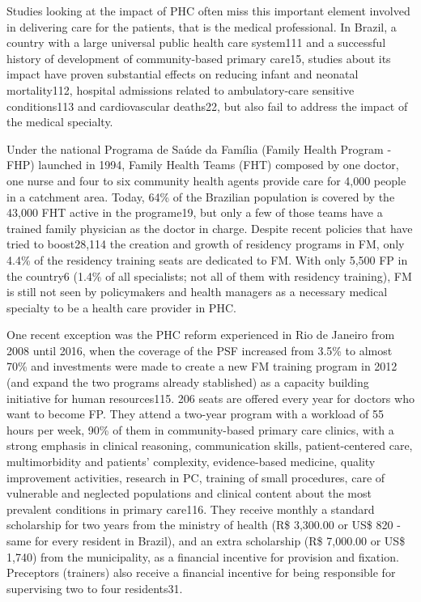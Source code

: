 \documentclass[]{book}
\begin{document}
Studies looking at the impact of PHC often miss this important element involved in delivering care for the patients, that is the medical professional. In Brazil, a country with a large universal public health care system111 and a successful history of development of community-based primary care15, studies about its impact have proven substantial effects on reducing infant and neonatal mortality112, hospital admissions related to ambulatory-care sensitive conditions113 and cardiovascular deaths22, but also fail to address the impact of the medical specialty.

Under the national Programa de Saúde da Família (Family Health Program - FHP) launched in 1994, Family Health Teams (FHT) composed by one doctor, one nurse and four to six community health agents provide care for 4,000 people in a catchment area. Today, 64\% of the Brazilian population is covered by the 43,000 FHT active in the programe19, but only a few of those teams have a trained family physician as the doctor in charge. Despite recent policies that have tried to boost28,114 the creation and growth of residency programs in FM, only 4.4\% of the residency training seats are dedicated to FM. With only 5,500 FP in the country6 (1.4\% of all specialists; not all of them with residency training), FM is still not seen by policymakers and health managers as a necessary medical specialty to be a health care provider in PHC.

One recent exception was the PHC reform experienced in Rio de Janeiro from 2008 until 2016, when the coverage of the PSF increased from 3.5\% to almost 70\% and investments were made to create a new FM training program in 2012 (and expand the two programs already stablished) as a capacity building initiative for human resources115. 206 seats are offered every year for doctors who want to become FP. They attend a two-year program with a workload of 55 hours per week, 90\% of them in community-based primary care clinics, with a strong emphasis in clinical reasoning, communication skills, patient-centered care, multimorbidity and patients' complexity, evidence-based medicine, quality improvement activities, research in PC, training of small procedures, care of vulnerable and neglected populations and clinical content about the most prevalent conditions in primary care116. They receive monthly a standard scholarship for two years from the ministry of health (R\$ 3,300.00 or US\$ 820 - same for every resident in Brazil), and an extra scholarship (R\$ 7,000.00 or US\$ 1,740) from the municipality, as a financial incentive for provision and fixation. Preceptors (trainers) also receive a financial incentive for being responsible for supervising two to four residents31.
\end{document}
